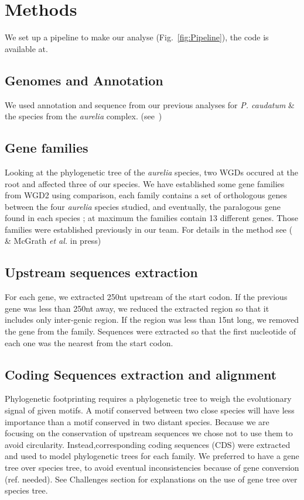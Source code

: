 \section*{Methods}

We set up a pipeline to make our analyse (Fig.~\ref{fig:Pipeline}), the code is available at.

\subsection*{Genomes and Annotation}

We used annotation and sequence from our previous analyses for \textit{P. caudatum} \& the species from the \textit{aurelia} complex. (see~\citet{mcgrath_insights_2014})

\subsection*{Gene families}

Looking at the phylogenetic tree of the \textit{aurelia} species, two WGDs occured at the root and affected three of our species. We have established some gene families from WGD2 using comparison, each family contains a set of orthologous genes between the four \textit{aurelia} species studied, and eventually, the paralogous gene found in each species ; at maximum the families contain 13 different genes. Those families were established previously in our team. For details in the method see (~\citet{mcgrath_insights_2014} \& McGrath \textit{et al.} in press)

\subsection*{Upstream sequences extraction}

For each gene, we extracted 250nt upstream of the start codon. If the previous gene was less than 250nt away, we reduced the extracted region so that it includes only inter-genic region. If the region was less than 15nt long, we removed the gene from the family. Sequences were extracted so that the first nucleotide of each one was the nearest from the start codon.

\subsection*{Coding Sequences extraction and alignment}

Phylogenetic footprinting requires a phylogenetic tree to weigh the evolutionary signal of given motifs. A motif conserved between two close species will have less importance than a motif conserved in two distant species. Because we are focusing on the conservation of upstream sequences we chose not to use them to avoid circularity. Instead,corresponding coding sequences (CDS) were extracted and used to model phylogenetic trees for each family. We preferred to have a gene tree over species tree, to avoid eventual inconsistencies because of gene conversion (ref. needed). See Challenges section for explanations on the use of gene tree over species tree.

